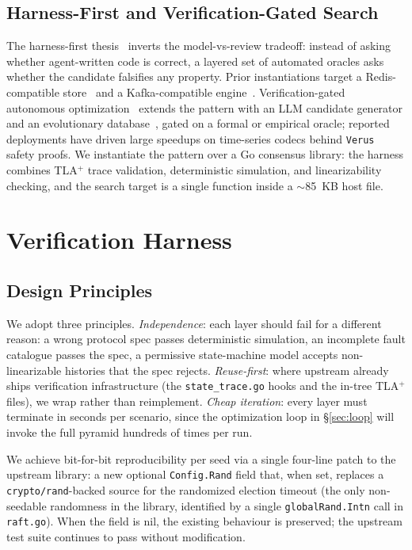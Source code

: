 \documentclass{article}
\begin{document}
\subsection{Harness-First and Verification-Gated Search}
The harness-first thesis~\cite{datadogHarness} inverts the
model-vs-review tradeoff: instead of asking whether agent-written
code is correct, a layered set of automated oracles asks whether the
candidate falsifies any property. Prior instantiations target a
Redis-compatible store~\cite{redisRust} and a Kafka-compatible
engine~\cite{datadogHarness}. Verification-gated autonomous
optimization~\cite{datadogAutonomous,barbarians2025} extends the
pattern with an LLM candidate generator and an evolutionary
database~\cite{openevolve,alphaevolve,funsearch,alphadev}, gated on a
formal or empirical oracle; reported deployments have driven large
speedups on time-series codecs behind \texttt{Verus}~\cite{verus}
safety proofs. We instantiate the pattern over a Go
consensus library: the harness combines TLA$^{+}$ trace validation,
deterministic simulation, and linearizability checking, and the
search target is a single function inside a $\sim$85~KB host file.

\section{Verification Harness}
\label{sec:harness}

\subsection{Design Principles}
We adopt three principles. \emph{Independence}: each layer should
fail for a different reason: a wrong protocol spec passes
deterministic simulation, an incomplete fault catalogue passes the
spec, a permissive state-machine model accepts non-linearizable
histories that the spec rejects. \emph{Reuse-first}: where upstream
already ships verification infrastructure (the \texttt{state\_trace.go}
hooks and the in-tree TLA$^{+}$ files), we wrap rather than
reimplement. \emph{Cheap iteration}: every layer must terminate in
seconds per scenario, since the optimization loop in \S\ref{sec:loop}
will invoke the full pyramid hundreds of times per run.

We achieve bit-for-bit reproducibility per seed via a single
four-line patch to the upstream library: a new optional
\texttt{Config.Rand} field that, when set, replaces a
\texttt{crypto/rand}-backed source for the randomized election
timeout (the only non-seedable randomness in the library, identified
by a single \texttt{globalRand.Intn} call in \texttt{raft.go}). When
the field is nil, the existing behaviour is preserved; the upstream
test suite continues to pass without modification.
\end{document}
